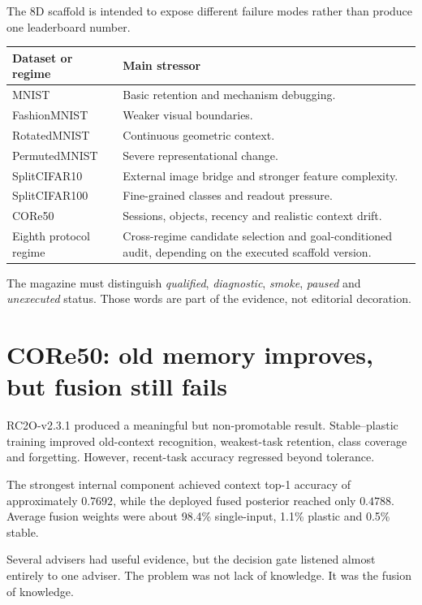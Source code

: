 \documentclass[11pt,a4paper]{article}
\newcommand{\tablehead}[1]{\cellcolor{DeepTeal}\color{white}\bfseries #1}
\begin{document}
The 8D scaffold is intended to expose different failure modes rather than produce one leaderboard number.

\begin{tabularx}{\textwidth}{p{3.1cm}X}
\toprule
\tablehead{Dataset or regime} & \tablehead{Main stressor}\\
\midrule
MNIST & Basic retention and mechanism debugging.\\
FashionMNIST & Weaker visual boundaries.\\
RotatedMNIST & Continuous geometric context.\\
PermutedMNIST & Severe representational change.\\
SplitCIFAR10 & External image bridge and stronger feature complexity.\\
SplitCIFAR100 & Fine-grained classes and readout pressure.\\
CORe50 & Sessions, objects, recency and realistic context drift.\\
Eighth protocol regime & Cross-regime candidate selection and goal-conditioned audit, depending on the executed scaffold version.\\
\bottomrule
\end{tabularx}

The magazine must distinguish \emph{qualified}, \emph{diagnostic}, \emph{smoke}, \emph{paused} and \emph{unexecuted} status. Those words are part of the evidence, not editorial decoration.

\newpage
\section{CORe50: old memory improves, but fusion still fails}

RC2O-v2.3.1 produced a meaningful but non-promotable result. Stable--plastic training improved old-context recognition, weakest-task retention, class coverage and forgetting. However, recent-task accuracy regressed beyond tolerance.

The strongest internal component achieved context top-1 accuracy of approximately $0.7692$, while the deployed fused posterior reached only $0.4788$. Average fusion weights were about 98.4\% single-input, 1.1\% plastic and 0.5\% stable.

\begin{twelvebox}
Several advisers had useful evidence, but the decision gate listened almost entirely to one adviser. The problem was not lack of knowledge. It was the fusion of knowledge.
\end{twelvebox}
\end{document}
